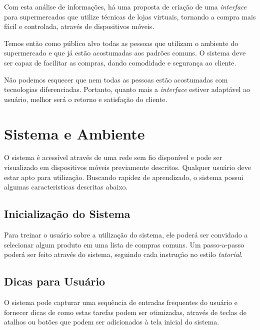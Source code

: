 \documentclass{article}
\begin{document}

Com esta análise de informações, há uma proposta de criação de uma
\emph{interface} para supermercados que utilize técnicas de lojas virtuais,
tornando a compra mais fácil e controlada, através de dispositivos móveis.


Temos então como público alvo todas as pessoas que utilizam o ambiente do
supermercado e que já estão acostumadas aos padrões comuns. O sistema deve ser
capaz de facilitar as compras, dando comodidade e segurança ao cliente.


Não podemos esquecer que nem todas as pessoas estão acostumadas com tecnologias
diferenciadas. Portanto, quanto mais a \emph{interface} estiver adaptável ao
usuário, melhor será o retorno e satisfação do cliente.

\section{Sistema e Ambiente}
\label{sec:sistema}


O sistema é acessível através de uma rede sem fio disponível e pode ser
visualizado em dispositivos móveis previamente descritos. Qualquer usuário deve
estar apto para utilização. Buscando rapidez de aprendizado, o sistema possui
algumas caracteristicas descritas abaixo.

\subsection{Inicialização do Sistema}


Para treinar o usuário sobre a utilização do sistema, ele poderá ser convidado a
selecionar algum produto em uma lista de compras comuns. Um passo-a-passo poderá
ser feito através do sistema, seguindo cada instrução no estilo \emph{tutorial}.

\subsection{Dicas para Usuário}


O sistema pode capturar uma sequência de entradas frequentes do usuário e
fornecer dicas de como estas tarefas podem ser otimizadas, através de teclas de
atalhos ou botões que podem ser adicionados à tela inicial do sistema.
\end{document}
